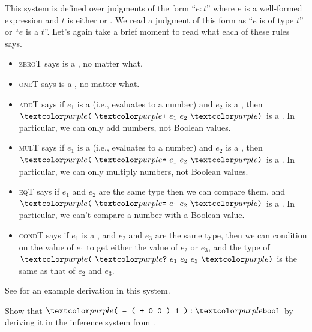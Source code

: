 This system is defined over judgments of the form \enquote{$e : t$} where $e$ is a well-formed expression and $t$ is either  or .
We read a judgment of this form as \enquote{$e$ is of type $t$} or \enquote{$e$ is a $t$}.
Let's again take a brief moment to read what each of these rules says.
\begin{itemize}
\item \textsc{zeroT} says  is a , no matter what.
\item \textsc{oneT} says  is a , no matter what.
\item \textsc{addT} says if $e_1$ is a  (i.e., evaluates to a number) and $e_2$ is a , then $\codel( \ \codel+ \ e_1 \ e_2 \ \codel)$ is a .
  In particular, we can only add numbers, not Boolean values.
\item \textsc{mulT} says if $e_1$ is a  (i.e., evaluates to a number) and $e_2$ is a , then $\codel( \ \codel* \ e_1 \ e_2 \ \codel)$ is a .
  In particular, we can only multiply numbers, not Boolean values.
\item \textsc{eqT} says if $e_1$ and $e_2$ are the same type then we can compare them, and $\codel( \ \codel= \ e_1 \ e_2 \ \codel)$ is a . In particular, we can't compare a number with a Boolean value.
\item \textsc{condT} says if $e_1$ is a , and $e_2$ and $e_3$ are the same type, then we can condition on the value of $e_1$ to get either the value of $e_2$ or $e_3$, and the type of $\codel( \ \codel? \ e_1 \ e_2 \ e_3 \ \codel)$ is the same as that of $e_2$ and $e_3$.
\end{itemize}
See  for an example derivation in this system.
\begin{exercise}
  Show that $\codel{( = ( + 0 0 ) 1 )} : \codel{bool}$ by deriving it in the inference system from .
\end{exercise}
